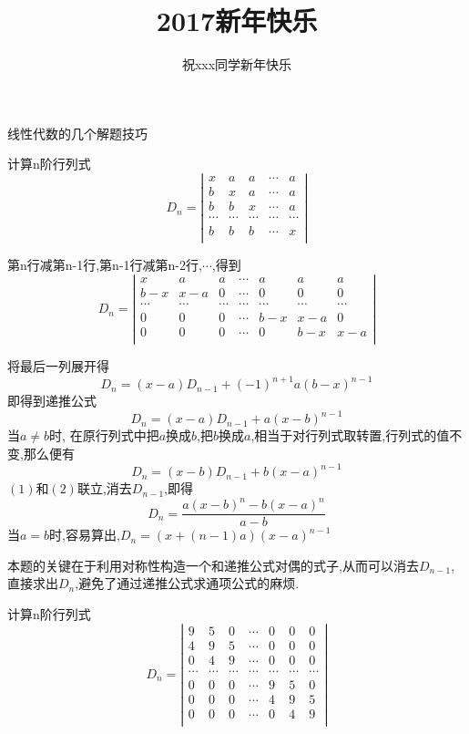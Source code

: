 \documentclass{ctexart}\pagestyle{empty}
\author{祝xxx同学新年快乐}
\title{2017新年快乐}
\begin{document}
\maketitle
线性代数的几个解题技巧


计算n阶行列式$$D_{n}=\left|
\begin{array}{ccccc}
x&a&a&\cdots&a\\
b&x&a&\cdots&a\\
b&b&x&\cdots&a\\
\cdots&\cdots&\cdots&\cdots&\cdots\\
b&b&b&\cdots&x\\
\end{array}
\right|$$



第n行减第n-1行,第n-1行减第n-2行,$\cdots$,得到
$$D_{n}=\left|
\begin{array}{cccccccc}
x&a&a&\cdots&a&a&a\\
b-x&x-a&0&\cdots&0&0&0\\
\cdots&\cdots&\cdots&\cdots&\cdots&\cdots&\cdots\\
0&0&0&\cdots&b-x&x-a&0\\
0&0&0&\cdots&0&b-x&x-a\\
\end{array}
\right|$$

将最后一列展开得$$D_{n}=(x-a)D_{n-1}+(-1)^{n+1}a(b-x)^{n-1}$$
即得到递推公式
\begin{equation}D_{n}=(x-a)D_{n-1}+a(x-b)^{n-1}
\end{equation}
当$a\neq b$时,
在原行列式中把$a$换成$b$,把$b$换成$a$,相当于对行列式取转置,行列式的值不变,那么便有
\begin{equation}
D_{n}=(x-b)D_{n-1}+b(x-a)^{n-1}
\end{equation}
$(1)$和$(2)$联立,消去$D_{n-1}$,即得$$D_{n}=\frac{a(x-b)^{n}-b(x-a)^{n}}{a-b}$$
当$a=b$时,容易算出,$D_{n}=(x+(n-1)a)(x-a)^{n-1}$


本题的关键在于利用对称性构造一个和递推公式对偶的式子,从而可以消去$D_{n-1}$,直接求出$D_{n}$,避免了通过递推公式求通项公式的麻烦.


计算n阶行列式$$D_{n}=\left|
\begin{array}{ccccccc}
9&5&0&\cdots&0&0&0\\
4&9&5&\cdots&0&0&0\\
0&4&9&\cdots&0&0&0\\
\cdots&\cdots&\cdots&\cdots&\cdots&\cdots&\cdots\\
0&0&0&\cdots&9&5&0\\
0&0&0&\cdots&4&9&5\\
0&0&0&\cdots&0&4&9\\
\end{array}
\right|$$
\end{document}
